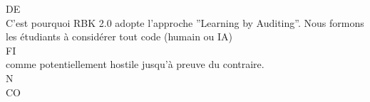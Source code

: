 \vspace{0.5em}
\vspace{0.5em}
\vspace{0.5em}
DE\\
C’est pourquoi RBK 2.0 adopte l’approche ”Learning by Auditing”. Nous formons les étudiants à considérer tout code (humain ou IA)\\
\vspace{0.5em}
\vspace{0.5em}
\vspace{0.5em}
\vspace{0.5em}
FI\\
comme potentiellement hostile jusqu’à preuve du contraire.\\
\vspace{0.5em}
\vspace{0.5em}
N\\
CO\\
